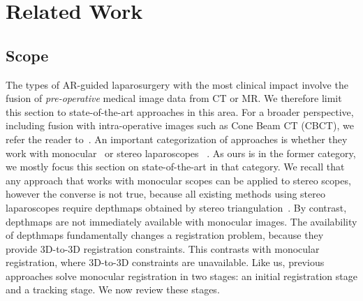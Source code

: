
\section{Related Work}
\label{sec:sota}
\subsection{Scope}
The types of AR-guided laparosurgery with the most clinical impact involve the fusion of \emph{pre-operative} medical image data from CT or MR. We therefore limit this section to state-of-the-art approaches in this area.
For a broader perspective, including fusion with intra-operative images such as Cone Beam CT (CBCT), we refer the reader to~\cite{Bernhardt2017}.
An important categorization of approaches is whether they work with monocular~\cite{affineTracking} or stereo laparoscopes ~\cite{21142942,conf/miccai/Amir-KhaliliNPHA13,Cohen2010Prostate,hamarneh2014igrs,haouchine13,Su2009, MaierHein2013}.
As ours is in the former category, we mostly focus this section on state-of-the-art in that category.
We recall that any approach that works with monocular scopes can be applied to stereo scopes, however the converse is not true, because all existing
methods using stereo laparoscopes require depthmaps obtained by stereo triangulation~\cite{DBLP:conf/miccai/StoyanovSPY10}.
By contrast, depthmaps are not immediately available with monocular images.
The availability of depthmaps fundamentally changes a registration problem, because they provide 3D-to-3D registration constraints.
This contrasts with monocular registration, where 3D-to-3D constraints are unavailable.
Like us, previous approaches solve monocular registration in two stages: an initial registration stage and a tracking stage.
We now review these stages.


